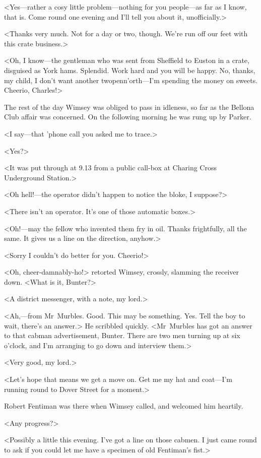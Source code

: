 <Yes—rather a cosy little problem—nothing for you people—as far as I know, that is. Come round one evening and I'll tell you about it, unofficially.>

<Thanks very much. Not for a day or two, though. We're run off our feet with this crate business.>

<Oh, I know—the gentleman who was sent from Sheffield to Euston in a crate, disguised as York hams. Splendid. Work hard and you will be happy. No, thanks, my child, I don't want another twopenn'orth—I'm spending the money on sweets. Cheerio, Charles!>

The rest of the day Wimsey was obliged to pass in idleness, so far as the Bellona Club affair was concerned. On the following morning he was rung up by Parker.

<I say—that 'phone call you asked me to trace.>

<Yes?>

<It was put through at 9.13  from a public call-box at Charing Cross Underground Station.>

<Oh hell!—the operator didn't happen to notice the bloke, I suppose?>

<There isn't an operator. It's one of those automatic boxes.>

<Oh!—may the fellow who invented them fry in oil. Thanks frightfully, all the same. It gives us a line on the direction, anyhow.>

<Sorry I couldn't do better for you. Cheerio!>

<Oh, cheer-damnably-ho!> retorted Wimsey, crossly, slamming the receiver down. <What is it, Bunter?>

<A district messenger, with a note, my lord.>

<Ah,—from Mr~Murbles. Good. This may be something. Yes. Tell the boy to wait, there's an answer.> He scribbled quickly. <Mr~Murbles has got an answer to that cabman advertisement, Bunter. There are two men turning up at six o'clock, and I'm arranging to go down and interview them.>

<Very good, my lord.>

<Let's hope that means we get a move on. Get me my hat and coat—I'm running round to Dover Street for a moment.>

Robert Fentiman was there when Wimsey called, and welcomed him heartily.

<Any progress?>

<Possibly a little this evening. I've got a line on those cabmen. I just came round to ask if you could let me have a specimen of old Fentiman's fist.>

